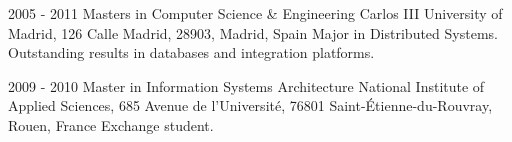 
\begin{rlist}
  \item 
    \education
      {2005 - 2011}
      {Masters in Computer Science \& Engineering}
      {Carlos III University of Madrid, 126 Calle Madrid, 28903, Madrid, Spain}
      {Major in Distributed Systems. Outstanding results in databases and integration platforms.}
  \item 
    \education
      {2009 - 2010}
      {Master in Information Systems Architecture}
      {National Institute of Applied Sciences, 685 Avenue de l’Université, 76801 Saint-Étienne-du-Rouvray, Rouen, France}
      {Exchange student.} 
\end{rlist}

